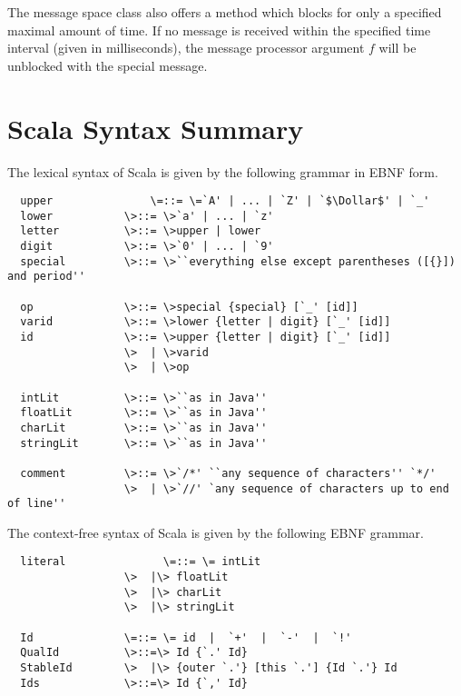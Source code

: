 \documentclass[11pt]{report}
\begin{document}
The message space class also offers a method \verb@receiveWithin@
which blocks for only a specified maximal amount of time.  If no
message is received within the specified time interval (given in
milliseconds), the message processor argument $f$ will be unblocked
with the special \verb@TIMEOUT@ message.

\appendix
\chapter{Scala Syntax Summary}

The lexical syntax of Scala is given by the following grammar in EBNF
form.

\begin{verbatim}
  upper               \=::= \=`A' | ... | `Z' | `$\Dollar$' | `_'
  lower           \>::= \>`a' | ... | `z'
  letter          \>::= \>upper | lower
  digit           \>::= \>`0' | ... | `9'
  special         \>::= \>``everything else except parentheses ([{}]) and period''

  op              \>::= \>special {special} [`_' [id]]
  varid           \>::= \>lower {letter | digit} [`_' [id]]
  id              \>::= \>upper {letter | digit} [`_' [id]]
                  \>  | \>varid
                  \>  | \>op

  intLit          \>::= \>``as in Java''
  floatLit        \>::= \>``as in Java''
  charLit         \>::= \>``as in Java''
  stringLit       \>::= \>``as in Java''

  comment         \>::= \>`/*' ``any sequence of characters'' `*/'
                  \>  | \>`//' `any sequence of characters up to end of line''
\end{verbatim}

The context-free syntax of Scala is given by the following EBNF
grammar.

\begin{verbatim}
  literal               \=::= \= intLit
                  \>  |\> floatLit
                  \>  |\> charLit
                  \>  |\> stringLit

  Id              \=::= \= id  |  `+'  |  `-'  |  `!'
  QualId          \>::=\> Id {`.' Id}
  StableId        \>  |\> {outer `.'} [this `.'] {Id `.'} Id
  Ids             \>::=\> Id {`,' Id}
\end{verbatim}
\end{document}
